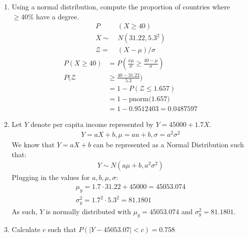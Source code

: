 \documentclass{article}
\begin{document}
\begin{enumerate}[label=\alph*)]
    \item Using a normal distribution, compute the proportion of countries where \(\geq 40\%\) have a degree.
          \begin{align*}
              P           & (X \geq 40)          \\
              X      \sim\ & N(31.22, 5.3^2) \\
              \mathcal{Z} =\ & (X - \mu)/\sigma
          \end{align*}
          \begin{align*}
              P(X \geq 40)  & = P(\frac{x\mu}{\sigma} \geq \frac{40-\mu}{\sigma}) \\
              P(\mathcal{Z} & \geq\frac{40-31.22}{5.3})                           \\
                            & = 1 - P(\mathcal{Z} \leq 1.657)                     \\
                            & = 1 - \text{pnorm(1.657)}                           \\
                            & = 1 - 0.9512403 = 0.0487597
          \end{align*}
    \item Let \(Y\) denote per capita income represented by \(Y = 45000 + 1.7X\).
          \begin{align*}
              Y = aX+b, \mu = au+b, \sigma = a^2\sigma^2
          \end{align*}
          We know that \(Y = aX + b\) can be represented as a Normal Distribution such that:
          \begin{align*}
              Y \sim N(a\mu + b, a^2\sigma^2)
          \end{align*}
          Plugging in the values for \(a, b, \mu, \sigma\):
          \begin{align*}
              \mu_y = 1.7\cdot 31.22 + 45000 = 45053.074 \\
              \sigma_y^2 = 1.7^2\cdot 5.3^2 = 81.1801
          \end{align*}
          As such, \(Y\) is normally distributed with \(\mu_y = 45053.074\) and \(\sigma_y^2 = 81.1801\).
    \item Calculate \(c\) such that \(P(|Y-45053.07| < c) = 0.758\)
          \begin{align*}

\end{align*}
\end{enumerate}
\end{document}
